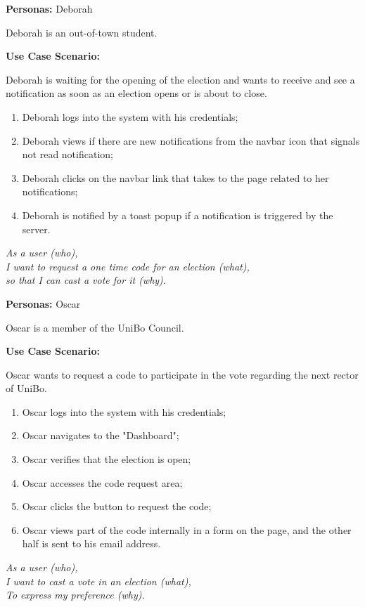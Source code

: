 \documentclass{scrartcl}
\begin{document}
\textbf{Personas:} Deborah

Deborah is an out-of-town student. 

\textbf{Use Case Scenario:}

Deborah is waiting for the opening of the election and wants to receive and see a notification as soon as an election opens or is about to close.

\begin{enumerate}
    \item Deborah logs into the system with his credentials;
    \item Deborah views if there are new notifications from the navbar icon that signals not read notification;
    \item Deborah clicks on the navbar link that takes to the page related to her notifications;
    \item Deborah is notified by a toast popup if a notification is triggered by the server.
\end{enumerate}

\vspace*{0.5cm}
\noindent
\emph{%
    As a user (who), \\
    I want to request a one time code for an election (what), \\
    so that I can cast a vote for it (why).
}
\vspace*{0.2cm}

\textbf{Personas:} Oscar

Oscar is a member of the UniBo Council. 

\textbf{Use Case Scenario:}

Oscar wants to request a code to participate in the vote regarding the next rector of UniBo.

\begin{enumerate}
    \item Oscar logs into the system with his credentials;
    \item Oscar navigates to the "Dashboard";
    \item Oscar verifies that the election is open;
    \item Oscar accesses the code request area;
    \item Oscar clicks the button to request the code;
    \item Oscar views part of the code internally in a form on the page, and the other half is sent to his email address.
\end{enumerate}

\vspace*{0.2cm}
\noindent
\emph{%
    As a user (who), \\
    I want to cast a vote in an election (what), \\
    To express my preference (why).
}
\vspace*{0.2cm}
\end{document}
